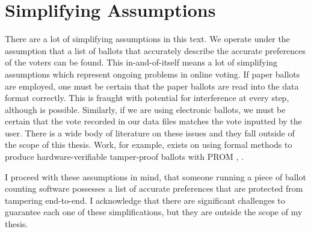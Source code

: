 \section{Simplifying Assumptions}

There are a lot of simplifying assumptions in this text. We operate under the
assumption that a list of ballots that accurately describe the accurate
preferences of the voters can be found. This in-and-of-itself means a lot of
simplifying assumptions which represent ongoing problems in online voting. If
paper ballots are employed, one must be certain that the paper ballots are read
into the data format correctly. This is fraught with potential for interference
at every step, although is possible. Similarly, if we are using electronic
ballots, we must be certain that the vote recorded in our data files matches the
vote inputted by the user. There is a wide body of literature on these issues
and they fall outside of the scope of this thesis. Work, for example, exists on
using formal methods to produce hardware-verifiable tamper-proof ballots with
PROM \cite{prom1}, \cite{prom2}. 

I proceed with these assumptions in mind, that someone running a piece of ballot
counting software possesses a list of accurate preferences that are protected from
tampering end-to-end. I acknowledge that there are significant challenges to
guarantee each one of these simplifications, but they are outside the scope of
my thesis. 